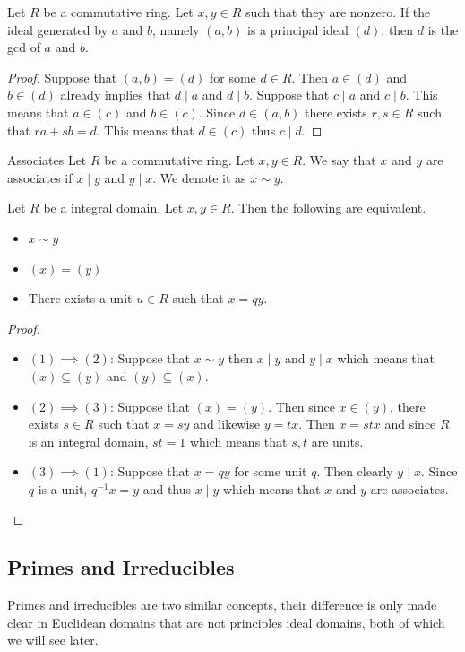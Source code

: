 \documentclass[a4paper]{article}
\begin{document}
\begin{prp}{}{} Let $R$ be a commutative ring. Let $x,y\in R$ such that they are nonzero. If the ideal generated by $a$ and $b$, namely $(a,b)$ is a principal ideal $(d)$, then $d$ is the gcd of $a$ and $b$. 
\begin{proof}
Suppose that $(a,b)=(d)$ for some $d\in R$. Then $a\in(d)$ and $b\in(d)$ already implies that $d\;|\;a$ and $d\;|\;b$. Suppose that $c\;|\;a$ and $c\;|\;b$. This means that $a\in(c)$ and $b\in(c)$. Since $d\in(a,b)$ there exists $r,s\in R$ such that $ra+sb=d$. This means that $d\in(c)$ thus $c\;|\;d$. 
\end{proof}
\end{prp}

\begin{defn}{Associates}{} Let $R$ be a commutative ring. Let $x,y\in R$. We say that $x$ and $y$ are associates if $x\;|\;y$ and $y\;|\;x$. We denote it as $x\sim y$. 
\end{defn}

\begin{prp}{}{} Let $R$ be a integral domain. Let $x,y\in R$. Then the following are equivalent. 
\begin{itemize}
\item $x\sim y$
\item $(x)=(y)$
\item There exists a unit $u\in R$ such that $x=qy$. 
\end{itemize} 
\begin{proof}
\begin{itemize}
\item $(1)\implies(2)$: Suppose that $x\sim y$ then $x\;|\;y$ and $y\;|\;x$ which means that $(x)\subseteq(y)$ and $(y)\subseteq(x)$. 
\item $(2)\implies(3)$: Suppose that $(x)=(y)$. Then since $x\in(y)$, there exists $s\in R$ such that $x=sy$ and likewise $y=tx$. Then $x=stx$ and since $R$ is an integral domain, $st=1$ which means that $s,t$ are units. 
\item $(3)\implies(1)$: Suppose that $x=qy$ for some unit $q$. Then clearly $y\;|\;x$. Since $q$ is a unit, $q^{-1}x=y$ and thus $x\;|\;y$ which means that $x$ and $y$ are associates. 
\end{itemize}
\end{proof}
\end{prp}

\subsection{Primes and Irreducibles}
Primes and irreducibles are two similar concepts, their difference is only made clear in Euclidean domains that are not principles ideal domains, both of which we will see later. 
\end{document}
